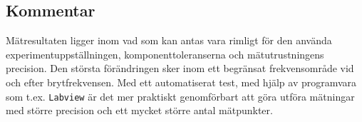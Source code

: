 \subsection{Kommentar}\label{}
Mätresultaten ligger inom vad som kan antas vara rimligt för den använda
experimentuppställningen, komponenttoleranserna och mätutrustningens precision.
Den största förändringen sker inom ett begränsat frekvensområde vid och efter
brytfrekvensen. Med ett automatiserat test, med hjälp av programvara som t.ex.
\texttt{Labview} är det mer praktiskt genomförbart att göra utföra mätningar
med större precision och ett mycket större antal mätpunkter.


